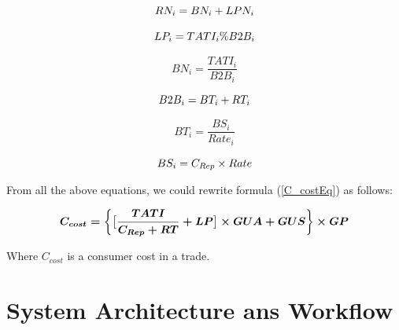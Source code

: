 \documentclass[letterpaper, 10 pt, conference]{ieeeconf}  %
\makeatletter
\newcommand{\mathleft}{\@fleqntrue\@mathmargin15pt}
\newcommand{\mathcenter}{\@fleqnfalse}
\makeatother
\begin{document}
\mathleft
\begin{equation}
\textbf{$ RN _{i} = BN _{i} + LPN _{i} $}   
\end{equation}

\vspace{-0.5 cm}

\mathleft
\begin{equation}
\textbf{$ LP _{i} = TATI _{i}  \%  B2B _{i} $}   
\end{equation}

\vspace{-0.5 cm}

\mathleft
\begin{equation}
BN _{i} = \frac{TATI _{i}}{B2B _{i}}
\end{equation}

\vspace{-0.5 cm}

\mathleft
\begin{equation}
\textbf{$ B2B _{i} = BT _{i} + RT _{i}$}    
\end{equation}

\vspace{-0.5 cm}

\mathleft
\begin{equation}
BT _{i} = \frac{BS _{i}}{Rate _{i} } 
\end{equation}

\vspace{-0.5 cm}

\mathleft
\begin{equation}
\textbf{$ BS _{i} = C_{Rep} \times Rate $}    
\end{equation}

\vspace{0.5 cm}

From all the above equations, we could rewrite formula (\ref{C_costEq}) as follows:

\begin{equation} \label{FCostEq}
\boldmath C_{cost} = \bigg\{ \big[ \frac{TATI}{C_{Rep}+RT} + LP\big] \times GUA + GUS \bigg\}\times GP
\end{equation}


Where $C_{cost}$ is a consumer cost in a trade.

\section{System Architecture ans Workflow} \label{Arch}
\end{document}
